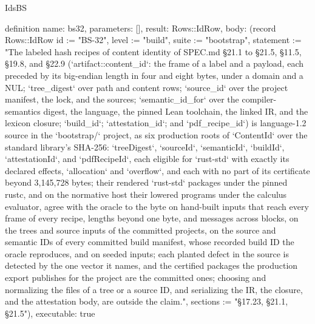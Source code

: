 \begin{lexlean}{IdsBS}
\begin{semanticmodule}
definition{
  name: bs32,
  parameters: [],
  result: Rows::IdRow,
  body: (record Rows::IdRow {id := "BS-32", level := "build", suite := "bootstrap", statement := "The labeled hash recipes of content identity of SPEC.md §21.1 to §21.5, §11.5, §19.8, and §22.9 (`artifact::content_id`: the frame of a label and a payload, each preceded by its big-endian length in four and eight bytes, under a domain and a NUL; `tree_digest` over path and content rows; `source_id` over the project manifest, the lock, and the sources; `semantic_id_for` over the compiler-semantics digest, the language, the pinned Lean toolchain, the linked IR, and the lexicon closure; `build_id`; `attestation_id`; and `pdf_recipe_id`) is language-1.2 source in the `bootstrap/` project, as six production roots of `ContentId` over the standard library's SHA-256: `treeDigest`, `sourceId`, `semanticId`, `buildId`, `attestationId`, and `pdfRecipeId`, each eligible for `rust-std` with exactly its declared effects, `allocation` and `overflow`, and each with no part of its certificate beyond 3,145,728 bytes; their rendered `rust-std` packages under the pinned rustc, and on the normative host their lowered programs under the calculus evaluator, agree with the oracle to the byte on hand-built inputs that reach every frame of every recipe, lengths beyond one byte, and messages across blocks, on the trees and source inputs of the committed projects, on the source and semantic IDs of every committed build manifest, whose recorded build ID the oracle reproduces, and on seeded inputs; each planted defect in the source is detected by the one vector it names, and the certified packages the production export publishes for the project are the committed ones; choosing and normalizing the files of a tree or a source ID, and serializing the IR, the closure, and the attestation body, are outside the claim.", sections := "§17.23, §21.1, §21.5"}),
  executable: true
}


\end{semanticmodule}
\end{lexlean}
